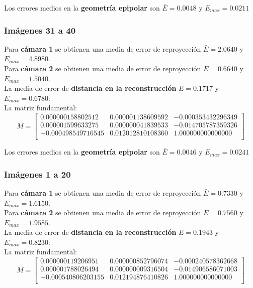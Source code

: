 \documentclass[a4paper, fontsize=11pt]{scrartcl} %
\numberwithin{equation}{section} %
\numberwithin{figure}{section} %
\numberwithin{table}{section} %
\begin{document}
	Los errores medios en la \textbf{geometría epipolar} son $\bar{E} = 0.0048$ y $E_{max} = 0.0211$
	
	\subsubsection*{Imágenes 31 a 40}
	
	Para \textbf{cámara 1} se obtienen una media de error de reproyección $\bar{E} = 2.0640$ y $E_{max} = 4.8980$.\\
	Para \textbf{cámara 2} se obtienen una media de error de reproyección $\bar{E} = 0.6640$ y $E_{max} = 1.5040$.\\
	
	La media de error de \textbf{distancia en la reconstrucción} $\bar{E} = 0.1717$ y $E_{max} = 0.6780$.\\
	La matriz fundamental:
	\[
	M=
	\begin{bmatrix}
	0.000000158802512&	0.000001138609592&	-0.000353432296349 \\
	0.000001599633275&	0.000000041839533&	-0.014705787359326 \\
	-0.000498549716545&	0.012012810108360&	1.000000000000000  \\
	
	\end{bmatrix}
	\]
	
	Los errores medios en la \textbf{geometría epipolar} son $\bar{E} = 0.0046$ y $E_{max} = 0.0241$
	
	\subsubsection*{Imágenes 1 a 20}
	
	Para \textbf{cámara 1} se obtienen una media de error de reproyección $\bar{E} = 0.7330$ y $E_{max} = 1.6150$.\\
	Para \textbf{cámara 2} se obtienen una media de error de reproyección $\bar{E} = 0.7560$ y $E_{max} = 1.9585$.\\
	
	La media de error de \textbf{distancia en la reconstrucción} $\bar{E} = 0.1943$ y $E_{max} = 0.8230$.\\
	La matriz fundamental:
	\[
	M=
	\begin{bmatrix}
	0.000000119206951&	0.000000852796074&	-0.000240578362668 \\
	0.000001788026494&	0.000000009316504&	-0.014906586071003 \\
	-0.000540806203155&	0.012194876410826&	1.000000000000000  \\
	
	\end{bmatrix}
	\]
	
\end{document}
